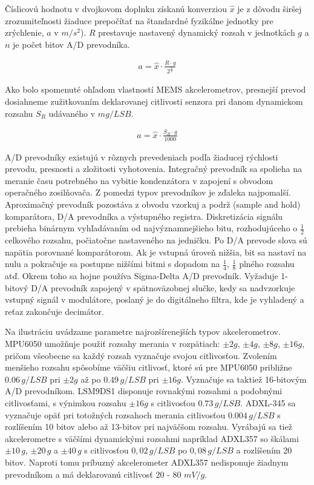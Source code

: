 Číslicovú hodnotu v dvojkovom doplnku získanú konverziou $\hat{x}$ je z dôvodu širšej zrozumiteľnosti žiaduce prepočítať na štandardné fyzikálne jednotky pre zrýchlenie, $a$ v $m/s^2$). $R$ prestavuje nastavený dynamický rozsah v jednotkách $g$ a $n$ je počet bitov A/D prevodníka.
\begin{ceqn}\begin{align}
   a = \hat{x} \cdot \frac{R \cdot g}{2^\frac{n}{2}}
\end{align}\end{ceqn}

Ako bolo spomenuté ohľadom vlastností MEMS akcelerometrov, presnejší prevod dosiahneme zužitkovaním deklarovanej citlivosti senzora pri danom dynamickom rozsahu $S_R$ udávaného v $mg/LSB$.
\begin{ceqn}\begin{align}
   a = \hat{x} \cdot \frac{S_R \cdot g}{1000}
\end{align}\end{ceqn}

A/D prevodníky existujú v rôznych prevedeniach podľa žiaducej rýchlosti prevodu, presnosti a zložitosti vyhotovenia. Integračný prevodník sa spolieha na meranie času potrebného na vybitie kondenzátora v zapojení s obvodom operačného zosilňovača. Z pomedzi typov prevodníkov je zďaleka najpomalší. Aproximačný prevodník pozostáva z obvodu vzorkuj a podrž (sample and hold) komparátora, D/A prevodníka a výstupného registra. Diskretizácia signálu prebieha binárnym vyhľadávaním od najvýznamnejšieho bitu, rozhodujúceho o $\frac{1}{2}$ celkového rozsahu, počiatočne nastaveného na jedničku. Po D/A prevode slova sú napätia porovnané komparátorom. Ak je vstupná úroveň nižšia, bit sa nastaví na nulu a pokračuje sa postupne nižšími bitmi s dopadom na $\frac{1}{4}$, $\frac{1}{8}$ plného rozsahu atď. Okrem toho sa hojne používa Sigma-Delta A/D prevodník. Vyžaduje 1-bitový D/A prevodník zapojený v spätnoväzobnej slučke,
kedy sa nadvzorkuje vstupný signál v modulátore, poslaný je do digitálneho filtra, kde je vyhladený a reťaz zakončuje decimátor.

Na ilustráciu uvádzame parametre najrozšírenejších typov akcelerometrov\cite{mems-accel-mechanical-vibrations}. MPU6050 umožňuje použiť rozsahy merania v rozpätiach: $\pm2g$, $\pm4g$, $\pm8g$, $\pm16g$, pričom všeobecne sa každý rozsah vyznačuje svojou citlivosťou. Zvolením menšieho rozsahu spôsobíme väčšiu citlivosť, ktoré sú pre MPU6050 približne $0.06\,g/LSB$ pri $\pm2g$ až po $0.49\,g/LSB$ pri $\pm16g$. Vyznačuje sa taktiež 16-bitovým A/D prevodníkom. LSM9DS1 disponuje rovnakými rozsahmi a podobnými citlivosťami, s výnimkou rozsahu $\pm 16g$ s citlivosťou $0.73\, g/LSB$. ADXL-345 sa vyznačuje opäť pri totožných rozsahoch merania citlivosťou $0.004\,g/LSB$ s rozlíšením 10 bitov alebo až 13-bitov pri najväčšom rozsahu. Vyrábajú sa tiež akcelerometre s väčšími dynamickými rozsahmi napríklad ADXL357 so škálami $\pm 10\,g$, $\pm 20\,g$ a $\pm 40\,g$ s citlivosťou $0,02\,g/LSB$ po $0,08\,g/LSB$ a rozlíšením 20 bitov. Naproti tomu príbuzný akcelerometer ADXL357 nedisponuje žiadnym prevodníkom a má deklarovanú citlivosť 20 - 80 $mV/g$.

